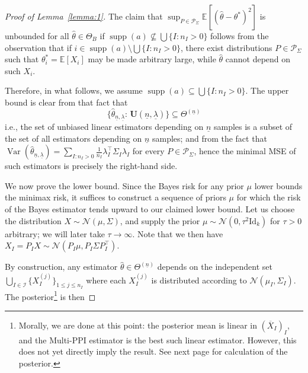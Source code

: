 \documentclass{article} %
\newcommand{\Ex}{\mathbb{E}}
\DeclareMathOperator{\Var}{Var}
\DeclareMathOperator{\supp}{supp}
\begin{document}
\begin{proof}[Proof of Lemma~\ref{lemma:1}] The claim that  $\sup_{P\in\mathcal{P}_\Sigma} \Ex\left[(\hat{\theta}-\theta^*)^2\right]$ is unbounded for all $\hat{\theta}\in\Theta_B$ if $\supp(a)\not\subseteq\bigcup\{I:n_I>0\}$ follows from the observation that if $i\in \supp(a)\setminus \bigcup\{I:n_I>0\}$, there exist distributions $P\in\mathcal{P}_\Sigma$ such that $\theta^*_i=\Ex[X_i]$ may be made arbitrary large, while $\hat{\theta}$ cannot depend on such $X_i$.

    Therefore, in what follows, we assume $\supp(a)\subseteq \bigcup\{I:n_I>0\}$. The upper bound is clear from that fact that
    \[
    \{\hat{\theta}_{\underline{n},\underline{\lambda}} : \,\mathbf{U}(\underline{n},\underline{\lambda})\}\subseteq \Theta^{(\underline{n})}
    \]
    i.e., the set of unbiased linear estimators depending on $\underline{n}$ samples is a subset of the set of all estimators depending on $\underline{n}$ samples; and from the fact that $\Var (\hat{\theta}_{\underline{n},\underline{\lambda}}) = \sum_{I:n_I>0}\frac{1}{n_I}\lambda_I^\top\Sigma_I\lambda_I$ for every $P\in\mathcal{P}_\Sigma$, hence the minimal MSE of such estimators is precisely the right-hand side.

    We now prove the lower bound. Since the Bayes risk for any prior $\mu$ lower bounds the minimax risk, it suffices to construct a sequence of priors $\mu$ for which the risk of the Bayes estimator tends upward to our claimed lower bound. Let us choose the distribution $X\sim \mathcal{N}(\mu,\Sigma)$, and supply the prior $\mu\sim \mathcal{N}(0,\tau^2\text{Id}_k)$ for $\tau>0$ arbitrary; we will later take $\tau\to\infty$. Note that we then have $X_I=P_IX\sim\mathcal{N}(P_I\mu,P_I\Sigma P_I^\top)$.
    
    By construction, any estimator $\hat{\theta}\in\Theta^{(\underline{n})}$ depends on the independent set $
    \bigcup_{I\in\mathcal{I}}\{X_I^{(j)}\}_{1\leq j\leq n_I}$ where each $X_I^{(j)}$ is distributed according to $\mathcal{N}(\mu_I,\Sigma_I)$. The posterior\footnote{Morally, we are done at this point: the posterior mean is linear in $(\overline{X}_I)_I$, and the Multi-PPI estimator is the best such linear estimator. However, this does not yet directly imply the result. See next page for calculation of the posterior.} is then
    

\end{proof}
\end{document}
